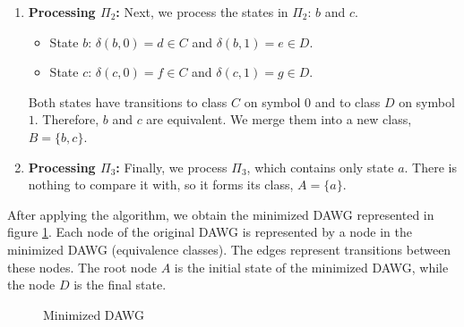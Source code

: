 \begin{example}
\begin{enumerate}
        \item \textbf{Processing $\Pi_2$:} Next, we process the states in $\Pi_2$: $b$ and $c$.
        \begin{itemize}
            \item State $b$: $\delta(b, 0) = d \in C$ and $\delta(b, 1) = e \in D$.
            \item State $c$: $\delta(c, 0) = f \in C$ and $\delta(c, 1) = g \in D$.
        \end{itemize}
        Both states have transitions to class $C$ on symbol $0$ and to class $D$ on symbol $1$. Therefore, $b$ and $c$ are equivalent. We merge them into a new class, $B = \{b, c\}$.

        \item \textbf{Processing $\Pi_3$:} Finally, we process $\Pi_3$, which contains only state $a$. There is nothing to compare it with, so it forms its class, $A = \{a\}$.
    \end{enumerate}

    After applying the algorithm, we obtain the minimized DAWG represented in figure \cref{fig:example_minimized_dawg}. Each node of the original DAWG is represented by a node in the minimized DAWG (equivalence classes). The edges represent transitions between these nodes. The root node $A$ is the initial state of the minimized DAWG, while the node $D$ is the final state.
    \begin{figure}[H]
        \centering
        \caption{Minimized DAWG}
        \label{fig:example_minimized_dawg}
    \end{figure}      


\end{example}
